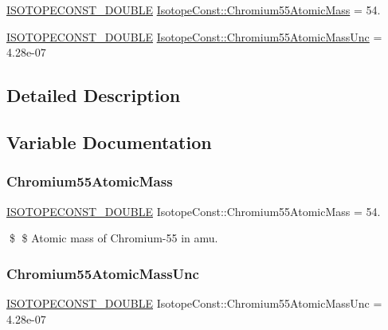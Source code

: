 \begin{DoxyCompactItemize}
\item 
\mbox{\hyperlink{group___isotope_const-_macros_ga8f45a7272ce02c0b4c65c44636ed719a}{I\+S\+O\+T\+O\+P\+E\+C\+O\+N\+S\+T\+\_\+\+D\+O\+U\+B\+LE}} \mbox{\hyperlink{group___isotope_const-_chromium-_cr55_gad4b3f0087e29a7af91b7acb9b9314791}{Isotope\+Const\+::\+Chromium55\+Atomic\+Mass}} = 54.
\item 
\mbox{\hyperlink{group___isotope_const-_macros_ga8f45a7272ce02c0b4c65c44636ed719a}{I\+S\+O\+T\+O\+P\+E\+C\+O\+N\+S\+T\+\_\+\+D\+O\+U\+B\+LE}} \mbox{\hyperlink{group___isotope_const-_chromium-_cr55_ga693c554e4db24c370ed6bae444af4e7c}{Isotope\+Const\+::\+Chromium55\+Atomic\+Mass\+Unc}} = 4.\+28e-\/07
\end{DoxyCompactItemize}


\subsection{Detailed Description}


\subsection{Variable Documentation}
\mbox{\label{group___isotope_const-_chromium-_cr55_gad4b3f0087e29a7af91b7acb9b9314791}} 
\subsubsection{\texorpdfstring{Chromium55\+Atomic\+Mass}{Chromium55AtomicMass}}
{\footnotesize\ttfamily \mbox{\hyperlink{group___isotope_const-_macros_ga8f45a7272ce02c0b4c65c44636ed719a}{I\+S\+O\+T\+O\+P\+E\+C\+O\+N\+S\+T\+\_\+\+D\+O\+U\+B\+LE}} Isotope\+Const\+::\+Chromium55\+Atomic\+Mass = 54.}

\$ \$ Atomic mass of Chromium-\/55 in amu. \mbox{\label{group___isotope_const-_chromium-_cr55_ga693c554e4db24c370ed6bae444af4e7c}} 
\subsubsection{\texorpdfstring{Chromium55\+Atomic\+Mass\+Unc}{Chromium55AtomicMassUnc}}
{\footnotesize\ttfamily \mbox{\hyperlink{group___isotope_const-_macros_ga8f45a7272ce02c0b4c65c44636ed719a}{I\+S\+O\+T\+O\+P\+E\+C\+O\+N\+S\+T\+\_\+\+D\+O\+U\+B\+LE}} Isotope\+Const\+::\+Chromium55\+Atomic\+Mass\+Unc = 4.\+28e-\/07}

